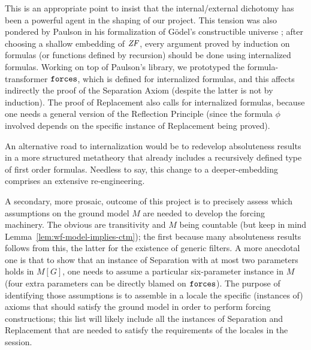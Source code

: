 This is an appropriate point to insist that the internal/external
dichotomy has been a powerful agent in the shaping of our project.
This tension was also pondered by Paulson in his formalization of
G\"odel's constructible universe \cite{paulson_2003}; after choosing a
shallow embedding of $\mathit{ZF}$, every argument proved by induction on
formulas (or functions defined by recursion) should be done using
internalized formulas. Working on top of Paulson's library, we
prototyped the formula-transformer $\mathop{\mathtt{forces}}$, which is defined for
internalized formulas, and this affects indirectly the proof of the
Separation Axiom (despite the latter is not by induction). The proof
of Replacement also calls for internalized formulas, because one needs
a general version of the Reflection Principle (since the formula
$\phi$ involved depends on the specific instance of Replacement being
proved). 

An alternative road to internalization would be to redevelop
absoluteness results in a more structured metatheory that already
includes a recursively defined type of first order formulas. Needless
to say, this change to a deeper-embedding comprises an extensive
re-engineering.

A secondary, more prosaic, outcome of this project is to precisely
assess which assumptions on the ground model $M$ are needed to develop
the forcing machinery. The obvious are transitivity and $M$ being
countable (but keep in mind Lemma~\ref{lem:wf-model-implies-ctm}); the
first because many absoluteness results follows from this, the latter
for the existence of generic filters. A
more anecdotal one is that to show that an instance of Separation
with at most two parameters holds in $M[G]$, one needs to assume a
particular  six-parameter
instance in $M$ (four extra parameters can be directly blamed on
$\mathop{\mathtt{forces}}$).  The purpose of identifying those assumptions is to assemble
in a locale the specific (instances of) axioms that should satisfy the
ground model in order to perform forcing constructions; this list will
likely include all the instances of Separation and Replacement that
are needed to satisfy the requirements of the locales in the
 session.

